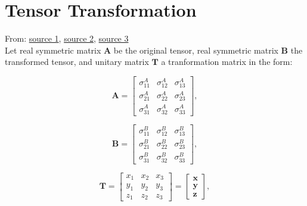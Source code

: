 \documentclass[10pt,b5paper,titlepage]{book}
\begin{document}
\chapter{Tensor Transformation}

From: \href{https://wp.optics.arizona.edu/optomech/wp-content/uploads/sites/53/2016/10/OPTI_222_W21.pdf}{source 1},
\href{https://www.continuummechanics.org/principalstressesandstrains.html}{source 2},
\href{https://www.ecourses.ou.edu/cgi-bin/eBook.cgi?doc=&topic=me&chap_sec=07.2&page=theory}{source 3} \\

Let real symmetric matrix  $\mathbf{A}$ be the original tensor,
real symmetric matrix $\mathbf{B}$ the transformed tensor, and
unitary matrix $\mathbf{T}$ a tranformation matrix in the form:

\begin{equation}
    \mathbf{A} = \begin{bmatrix}
        \sigma^{A}_{11} & \sigma^{A}_{12} & \sigma^{A}_{13} \\
        \sigma^{A}_{21} & \sigma^{A}_{22} & \sigma^{A}_{23} \\
        \sigma^{A}_{31} & \sigma^{A}_{32} & \sigma^{A}_{33}
    \end{bmatrix}
,\end{equation}

\begin{equation}
    \mathbf{B} = \begin{bmatrix}
        \sigma^{B}_{11} & \sigma^{B}_{12} & \sigma^{B}_{13} \\
        \sigma^{B}_{21} & \sigma^{B}_{22} & \sigma^{B}_{23} \\
        \sigma^{B}_{31} & \sigma^{B}_{32} & \sigma^{B}_{33}
    \end{bmatrix}
,\end{equation}

\begin{equation}
    \mathbf{T} = \begin{bmatrix}
        x_1 & x_2 & x_3 \\
        y_1 & y_2 & y_3 \\
        z_1 & z_2 & z_3
    \end{bmatrix} = \begin{bmatrix}
        \mathbf{x} \\
        \mathbf{y} \\
        \mathbf{z}
    \end{bmatrix}
,\end{equation}
\end{document}
